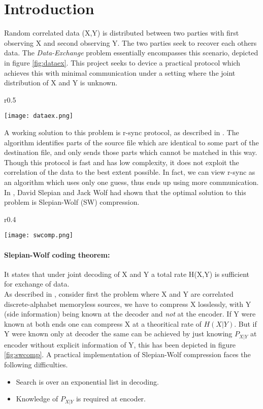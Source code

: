 \documentclass[
11pt, %
a4paper, %
oneside, %
headinclude,footinclude, %
BCOR5mm, %
]{scrartcl}
\begin{document}
\section{Introduction}\label{intro}
Random correlated data (X,Y) is distributed between two parties with first observing X and second observing Y. The two parties seek to recover each others data. The \emph{Data-Exchange} problem essentially encompasses this scenario,  depicted in figure \ref{fig:dataex}. This project seeks to device a practical protocol which achieves this with minimal communication under a setting where the joint distribution of X and Y is unknown.\\
\begin{wrapfigure}{r}{0.5\textwidth}
  \begin{center}
    \texttt{[image: dataex.png]}
  \end{center}
  \caption{The Data-Exchange problem}
  \label{fig:dataex}
\end{wrapfigure}
A working solution to this problem is r-sync protocol, as described in   \cite{rsync}. The algorithm identifies parts of the source file which are identical to some part of the destination file, and only sends those parts which cannot be matched in this way. Though this protocol is fast and has low complexity, it does not exploit the correlation of the data to the best extent possible. In fact, we can view r-sync as an algorithm which uses only one guess,  thus ends up using more communication.\\
In \cite{sw}, David Slepian and Jack Wolf had shown that the optimal solution to this problem is Slepian-Wolf (SW) compression. 
\begin{wrapfigure}{r}{0.4\textwidth}
  \begin{center}
    \texttt{[image: swcomp.png]}
  \end{center}
  \caption{The Slepian-Wolf compression}
  \label{fig:swcomp}
\end{wrapfigure}
\paragraph{Slepian-Wolf coding theorem:}It states that under joint decoding of X and Y a total rate H(X,Y) is sufficient for exchange of data.\\
As described in \cite{discus}, consider first the problem where X and Y are correlated discrete-alphabet memoryless sources, we have to compress X losslessly, with Y (side information) being known at the decoder and \emph{not} at the encoder. If Y were known at both ends one can compress X at a theoritical rate of $H(X|Y)$. But if Y were known only at decoder the same can be achieved by just knowing $P_{X|Y}$ at encoder without explicit information of Y, this has been depicted in figure \ref{fig:swcomp}. 
\clearpage
A practical implementation of Slepian-Wolf compression faces the following difficulties.
\begin{itemize}
\item Search is over an exponential list in decoding.
\item Knowledge of $P_{X|Y}$ is required at encoder.
\end{itemize} 
\end{document}
